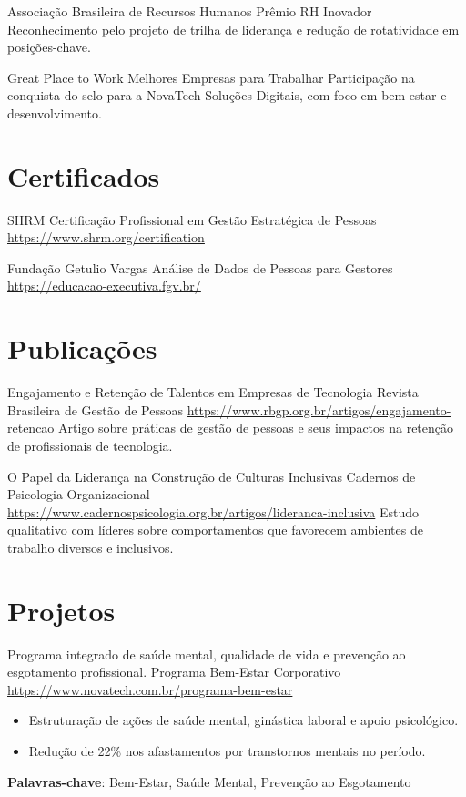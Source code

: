 \documentclass[a4paper, serif, 10pt]{moderncv}
\begin{document}
        {Associação Brasileira de Recursos Humanos}
        {Prêmio RH Inovador}
        {}
        {}
        {Reconhecimento pelo projeto de trilha de liderança e redução de rotatividade em posições-chave.}

        {Great Place to Work}
        {Melhores Empresas para Trabalhar}
        {}
        {}
        {Participação na conquista do selo para a NovaTech Soluções Digitais, com foco em bem-estar e desenvolvimento.}
\section{Certificados}

        {SHRM}
        {Certificação Profissional em Gestão Estratégica de Pessoas}
        {\url{https://www.shrm.org/certification}}
        {}
        {}

        {Fundação Getulio Vargas}
        {Análise de Dados de Pessoas para Gestores}
        {\url{https://educacao-executiva.fgv.br/}}
        {}
        {}
\section{Publicações}

        {Engajamento e Retenção de Talentos em Empresas de Tecnologia}
        {Revista Brasileira de Gestão de Pessoas}
        {\url{https://www.rbgp.org.br/artigos/engajamento-retencao}}
        {}
        {Artigo sobre práticas de gestão de pessoas e seus impactos na retenção de profissionais de tecnologia.}

        {O Papel da Liderança na Construção de Culturas Inclusivas}
        {Cadernos de Psicologia Organizacional}
        {\url{https://www.cadernospsicologia.org.br/artigos/lideranca-inclusiva}}
        {}
        {Estudo qualitativo com líderes sobre comportamentos que favorecem ambientes de trabalho diversos e inclusivos.}
\section{Projetos}

        {Programa integrado de saúde mental, qualidade de vida e prevenção ao esgotamento profissional.}
        {Programa Bem-Estar Corporativo}
        {\url{https://www.novatech.com.br/programa-bem-estar}}
        {}
        {\begin{itemize}
\item Estruturação de ações de saúde mental, ginástica laboral e apoio psicológico.
\item Redução de 22\% nos afastamentos por transtornos mentais no período.
\end{itemize}
\textbf{Palavras-chave}: Bem-Estar, Saúde Mental, Prevenção ao Esgotamento}
\end{document}
